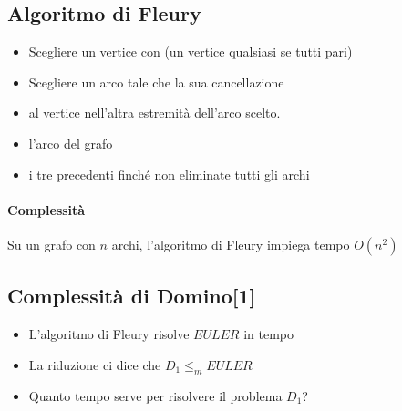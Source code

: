 \subsection{Algoritmo di Fleury}
\begin{itemize}
  \item Scegliere un vertice con  
    (un vertice qualsiasi se tutti pari)
  \item Scegliere un arco tale che la sua cancellazione 
  \item {} al vertice nell'altra estremità dell'arco scelto.
  \item {} l'arco del grafo
  \item {} i tre precedenti finché non eliminate tutti gli archi
\end{itemize}
\paragraph{Complessità} Su un grafo con $n$ archi, l'algoritmo di Fleury impiega 
tempo $O(n^2)$ 
\subsection{Complessità di Domino[1]}
\begin{itemize}
  \item L'algoritmo di Fleury risolve $EULER$ in tempo 
  \item La riduzione ci dice che $D_1 \leq_m EULER$ 
  \item Quanto tempo serve per risolvere il problema $D_1$? 
\end{itemize}
